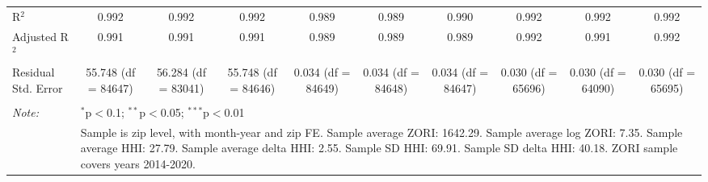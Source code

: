 \begin{table}[H]
{\begin{tabular}{@{\extracolsep{5pt}}lccccccccc}
 R$^{2}$ & 0.992 & 0.992 & 0.992 & 0.989 & 0.989 & 0.990 & 0.992 & 0.992 & 0.992 \\  

 Adjusted R$^{2}$ & 0.991 & 0.991 & 0.991 & 0.989 & 0.989 & 0.989 & 0.992 & 0.991 & 0.992 \\  

 Residual Std. Error & 55.748 (df = 84647) & 56.284 (df = 83041) & 55.748 (df = 84646) & 0.034 (df = 84649) & 0.034 (df = 84648) & 0.034 (df = 84647) & 0.030 (df = 65696) & 0.030 (df = 64090) & 0.030 (df = 65695) \\  

 \hline  

 \hline \\[-1.8ex]  

 \textit{Note:}  & \multicolumn{9}{l}{$^{*}$p$<$0.1; $^{**}$p$<$0.05; $^{***}$p$<$0.01} \\  

  & \multicolumn{9}{l}{Sample is zip level, with month-year and zip FE. Sample average ZORI: 1642.29. Sample average log ZORI: 7.35. Sample average HHI: 27.79. Sample average delta HHI: 2.55. Sample SD HHI: 69.91. Sample SD delta HHI: 40.18. ZORI sample covers years 2014-2020.} \\  

 \end{tabular}}  

 \end{table}  

 




